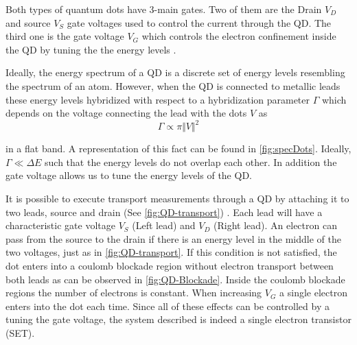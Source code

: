   Both types  of quantum dots have $3$-main gates. Two of them are the Drain $V_D$ and source $V_S$ gate voltages used to control the current through the QD. The third one is the gate voltage $V_G$ which controls the electron confinement  inside the QD by tuning the  the energy levels . 



Ideally, the energy spectrum of a QD is a discrete set of energy levels resembling the spectrum of an atom. However, when the QD is connected to metallic leads these energy levels hybridized with respect to a hybridization parameter $\Gamma$ which depends on the voltage connecting the lead with the dots $V$ as 
\begin{equation}
    \Gamma \propto \pi \Vert V \Vert^2
\end{equation}

in a flat band. A representation of this fact can be found in  \ref{fig:specDots}. Ideally, $\Gamma \ll \Delta E$ such that the energy levels do not overlap each other. In addition the gate voltage allows us to tune the energy levels of the QD.

It is possible to execute transport measurements through a QD by attaching it to two leads, source and drain (See \ref{fig:QD-transport}) . Each lead will have a characteristic gate voltage $V_S$ (Left lead) and $V_D$ (Right lead). An electron can pass from the source to the drain if there is an energy level in the middle of the two voltages, just as in \ref{fig:QD-transport}. If this condition is not satisfied,  the dot enters into a coulomb blockade region without  electron transport between both leads as can be observed in \ref{fig:QD-Blockade}. Inside the coulomb blockade regions the number of electrons is constant. When increasing $V_G$ a single electron enters into the dot each time. Since all of these effects can be controlled by a tuning the gate voltage, the system described is indeed a single electron transistor (SET).  







